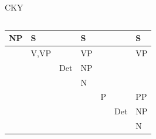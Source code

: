 \documentclass[
	hyperref={unicode},
	xcolor={svgnames, table},
	aspectratio=169,
	french,
]{beamer}
\begin{document}
\begin{frame}{CKY}
\begin{columns}
\begin{column}{0.65\textwidth}
{\begin{table}[]
\begin{tabular}{lllllll}
\hline
\multicolumn{1}{|l|}{{\color[HTML]{FFFFFF} NP}} & \multicolumn{1}{l|}{{\color[HTML]{FFFFFF} S}}     & \multicolumn{1}{l|}{}                           & \multicolumn{1}{l|}{{\color[HTML]{FFFFFF} S}}  & \multicolumn{1}{l|}{}                         & \multicolumn{1}{l|}{}                           & \multicolumn{1}{l|}{{\color[HTML]{FFFFFF} S}}  \\ \hline
\multicolumn{1}{l|}{}                           & \multicolumn{1}{l|}{{\color[HTML]{FFFFFF} \small{V,VP}}} & \multicolumn{1}{l|}{}                           & \multicolumn{1}{l|}{{\color[HTML]{FFFFFF} VP}} & \multicolumn{1}{l|}{}                         & \multicolumn{1}{l|}{}                           & \multicolumn{1}{l|}{{\color[HTML]{FFFFFF} VP}} \\ \cline{2-7} 
																								& \multicolumn{1}{l|}{}                             & \multicolumn{1}{l|}{{\color[HTML]{FFFFFF} Det}} & \multicolumn{1}{l|}{{\color[HTML]{FFFFFF} NP}} & \multicolumn{1}{l|}{}                         & \multicolumn{1}{l|}{}                           & \multicolumn{1}{l|}{}                          \\ \cline{3-7} 
																								&                                                   & \multicolumn{1}{l|}{}                           & \multicolumn{1}{l|}{{\color[HTML]{FFFFFF} N}}  & \multicolumn{1}{l|}{}                         & \multicolumn{1}{l|}{}                           & \multicolumn{1}{l|}{}                          \\ \cline{4-7} 
																								&                                                   &                                                 & \multicolumn{1}{l|}{}                          & \multicolumn{1}{l|}{{\color[HTML]{FFFFFF} P}} & \multicolumn{1}{l|}{}                           & \multicolumn{1}{l|}{{\color[HTML]{FFFFFF} PP}} \\ \cline{5-7} 
																								&                                                   &                                                 &                                                & \multicolumn{1}{l|}{}                         & \multicolumn{1}{l|}{{\color[HTML]{FFFFFF} Det}} & \multicolumn{1}{l|}{{\color[HTML]{FFFFFF} NP}} \\ \cline{6-7} 
																								&                                                   &                                                 &                                                &                                               & \multicolumn{1}{l|}{}                           & \multicolumn{1}{l|}{{\color[HTML]{FFFFFF} N}}  \\ \cline{7-7} 

\end{tabular}
\end{table}}
\end{column}
\end{columns}
\end{frame}
\end{document}
